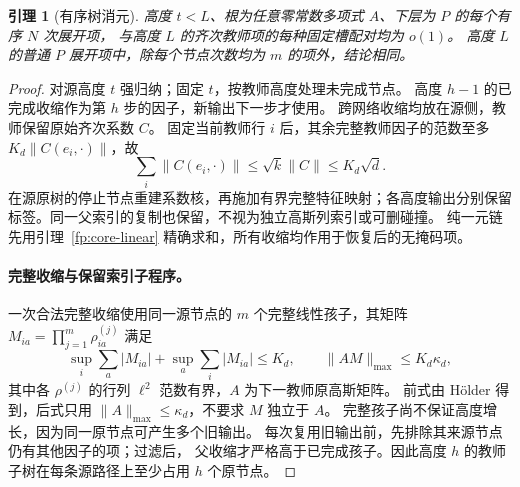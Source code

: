 \documentclass[a4paper]{tufte-handout}
\newtheorem{lemma}{引理}
\begin{document}
\begin{fullwidth}
\begin{lemma}[有序树消元]\label{fp:lowest-cut}\label{fp:permanent-mark}\label{fp:core-spectator}
高度 $t<L$、根为任意零常数多项式 $A$、下层为 $P$ 的每个有序 $N$ 次展开项，
与高度 $L$ 的齐次教师项的每种固定槽配对均为 $o(1)$。
高度 $L$ 的普通 $P$ 展开项中，除每个节点次数均为 $m$ 的项外，结论相同。
\end{lemma}
\begin{proof}
对源高度 $t$ 强归纳；固定 $t$，按教师高度处理未完成节点。
高度 $h-1$ 的已完成收缩作为第 $h$ 步的因子，新输出下一步才使用。
跨网络收缩均放在源侧，教师保留原始齐次系数 $C$。
固定当前教师行 $i$ 后，其余完整教师因子的范数至多 $K_d\|C(e_i,\cdot)\|$，故
\begin{equation}\label{fp:teacher-slices}
 \sum_i\|C(e_i,\cdot)\|\le\sqrt{k}\|C\|\le K_d\sqrt d.
\end{equation}
在源原树的停止节点重建系数核，再施加有界完整特征映射；各高度输出分别保留标签。同一父索引的复制也保留，不视为独立高斯列索引或可删碰撞。
纯一元链先用引理~\ref{fp:core-linear} 精确求和，所有收缩均作用于恢复后的无掩码项。

\paragraph{完整收缩与保留索引子程序。}
一次合法完整收缩使用同一源节点的 $m$ 个完整线性孩子，其矩阵
$M_{ia}=\prod_{j=1}^m\rho^{(j)}_{ia}$ 满足
\begin{equation}\label{fp:metric-schur}
 \sup_i\sum_a|M_{ia}|+\sup_a\sum_i|M_{ia}|\le K_d,
 \qquad \|AM\|_{\max}\le K_d\kappa_d,
\end{equation}
其中各 $\rho^{(j)}$ 的行列 $\ell^2$ 范数有界，$A$ 为下一教师原高斯矩阵。
前式由 H\"older 得到，后式只用 $\|A\|_{\max}\le\kappa_d$，不要求 $M$ 独立于 $A$。
完整孩子尚不保证高度增长，因为同一原节点可产生多个旧输出。
每次复用旧输出前，先排除其来源节点仍有其他因子的项；过滤后，
父收缩才严格高于已完成孩子。因此高度 $h$ 的教师子树在每条源路径上至少占用 $h$ 个原节点。


\end{proof}
\end{fullwidth}
\end{document}
